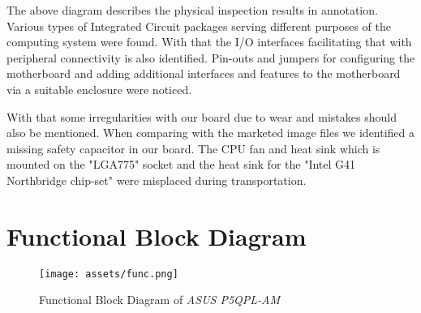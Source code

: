 The above diagram describes the physical inspection results in annotation. Various types of Integrated Circuit packages serving different purposes of the computing system were found. With that the I/O interfaces facilitating that with peripheral connectivity is also identified. Pin-outs and jumpers for configuring the motherboard and adding additional interfaces and features to the motherboard via a suitable enclosure were noticed.

With that some irregularities with our board due to wear and mistakes should also be mentioned. When comparing with the marketed image files we identified a missing safety capacitor in our board. The CPU fan and heat sink which is mounted on the "LGA775" socket and the heat sink for the "Intel G41 Northbridge chip-set" were misplaced during transportation.

\section{Functional Block Diagram}

\begin{figure}[H]
\begin{center}
\texttt{[image: assets/func.png]}
\caption{Functional Block Diagram of \emph{ASUS P5QPL-AM}} \label{fig:using:functionalblockImage}
\end{center}
\end{figure}



